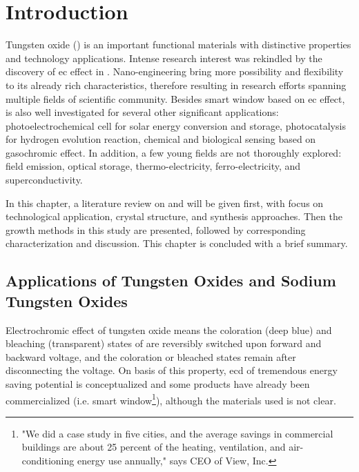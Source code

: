 
\section{Introduction}

Tungsten oxide () is an important functional materials with distinctive properties and technology applications. Intense research interest was rekindled by the discovery of \gls{ec} effect in \citeyear{Granqvist1993}.\cite{Granqvist1993}  Nano-engineering  bring more possibility and flexibility to its already rich characteristics, therefore resulting in research efforts spanning multiple fields of scientific community. Besides smart window based on \gls{ec} effect,  is also well investigated for several other significant applications: photoelectrochemical cell for solar energy conversion and storage, photocatalysis for hydrogen evolution reaction, chemical and biological sensing based on gasochromic effect. In addition, a few young fields are not thoroughly explored: field emission, optical storage, thermo-electricity, ferro-electricity, and superconductivity.

In this chapter, a literature review on  and  will be given first, with focus on technological application, crystal structure, and synthesis approaches. Then the growth methods in this study are presented, followed by corresponding characterization and discussion. This chapter is concluded with a brief summary.

\subsection{Applications of Tungsten Oxides and Sodium Tungsten Oxides}

Electrochromic effect of tungsten oxide means the coloration (deep blue) and bleaching (transparent) states of  are reversibly switched upon forward and backward voltage, and the coloration or bleached states remain after disconnecting the voltage. On basis of this property, \gls{ecd} of tremendous energy saving potential is conceptualized and some products have already been commercialized (i.e. smart window\footnote{"We did a case study in five cities, and the average savings in commercial buildings are about 25 percent of the heating, ventilation, and air-conditioning energy use annually," says CEO of View, Inc.}), although the materials used is not clear. 

